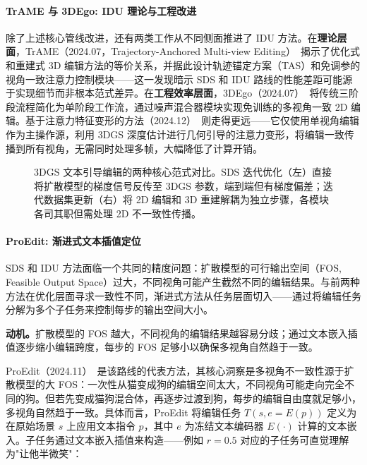 \paragraph{TrAME 与 3DEgo: IDU 理论与工程改进}

除了上述核心管线改进，还有两类工作从不同侧面推进了 IDU 方法。在\textbf{理论层面}，TrAME（2024.07，Trajectory-Anchored Multi-view Editing）~\cite{2407_02034}揭示了优化式和重建式 3D 编辑方法的等价关系，并据此设计轨迹锚定方案（TAS）和免调参的视角一致注意力控制模块——这一发现暗示 SDS 和 IDU 路线的性能差距可能源于实现细节而非根本范式差异。在\textbf{工程效率层面}，3DEgo（2024.07）~\cite{2407_10102}将传统三阶段流程简化为单阶段工作流，通过噪声混合器模块实现免训练的多视角一致 2D 编辑。基于注意力特征变形的方法（2024.12）~\cite{2412_07984}则走得更远——它仅使用单视角编辑作为主操作源，利用 3DGS 深度估计进行几何引导的注意力变形，将编辑一致传播到所有视角，无需同时处理多帧，大幅降低了计算开销。

\begin{figure}[htbp]
\centering
\resizebox{0.9\textwidth}{!}{}
\caption{3DGS 文本引导编辑的两种核心范式对比。SDS 迭代优化（左）直接将扩散模型的梯度信号反传至 3DGS 参数，端到端但有梯度偏差；迭代数据集更新（右）将 2D 编辑和 3D 重建解耦为独立步骤，各模块各司其职但需处理 2D 不一致性传播。}
\label{fig:ch09_sds_vs_idu}
\end{figure}

\paragraph{ProEdit: 渐进式文本插值定位}

SDS 和 IDU 方法面临一个共同的精度问题：扩散模型的可行输出空间（FOS, Feasible Output Space）过大，不同视角可能产生截然不同的编辑结果。与前两种方法在优化层面寻求一致性不同，渐进式方法从任务层面切入——通过将编辑任务分解为多个子任务来控制每步的输出空间大小。

\textbf{动机。}扩散模型的 FOS 越大，不同视角的编辑结果越容易分歧；通过文本嵌入插值逐步缩小编辑跨度，每步的 FOS 足够小以确保多视角自然趋于一致。

ProEdit（2024.11）~\cite{2411_05006}是该路线的代表方法，其核心洞察是多视角不一致性源于扩散模型的大 FOS：一次性从猫变成狗的编辑空间太大，不同视角可能走向完全不同的狗。但若先变成猫狗混合体，再逐步过渡到狗，每步的编辑自由度就足够小，多视角自然趋于一致。具体而言，ProEdit 将编辑任务 $T(s, e=E(p))$ 定义为在原始场景 $s$ 上应用文本指令 $p$，其中 $e$ 为冻结文本编码器 $E(\cdot)$ 计算的文本嵌入。子任务通过文本嵌入插值来构造——例如 $r{=}0.5$ 对应的子任务可直觉理解为"让他半微笑"：

